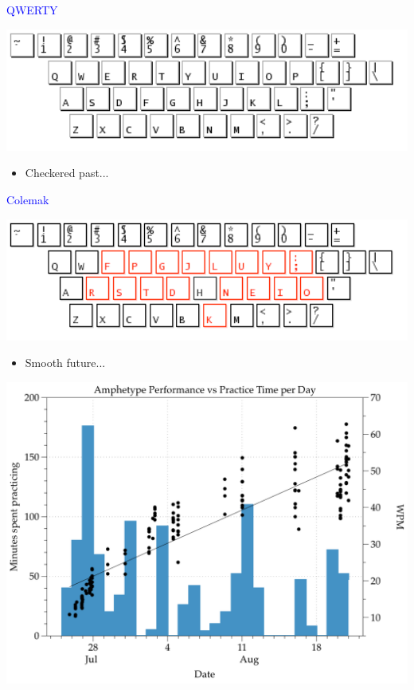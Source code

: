 \documentclass[landscape]{slides}
\begin{document}
\begin{slide}

    \textcolor{blue}{\Large{QWERTY}}

    \centering
    \includegraphics[width=20cm]{qwerty}

    \begin{itemize}
        \item Checkered past...
    \end{itemize}

\end{slide}


\begin{slide}

    \textcolor{blue}{\Large{Colemak}}

    \centering
    \includegraphics[width=20cm]{colemak-annot}

    \begin{itemize}
        \item Smooth future...
    \end{itemize}

\end{slide}


\begin{slide}

    \includegraphics[width=\textwidth]{amphetype}

\end{slide}
\end{document}
